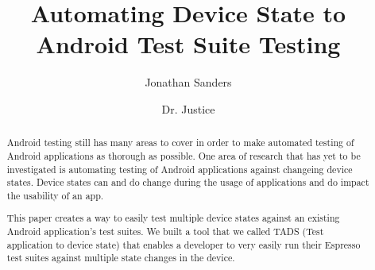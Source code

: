 \documentclass[sigconf]{acmart}
\begin{document}
\title{Automating Device State to Android Test Suite Testing }

\author{Jonathan Sanders}

\author{Dr. Justice}





\begin{abstract}
Android testing still has many areas to cover in order to make automated testing of Android applications as thorough as possible.  One area of research that has yet to be investigated is automating testing of Android applications against changeing device states.  Device states can and do change during the usage of applications and do impact the usability of an app.

This paper creates a way to easily test multiple device states against an existing Android application's test suites.  We built a tool that we called TADS (Test application to device state) that enables a developer to very easily run their Espresso test suites against multiple state changes in the device.  
\end{abstract}





\maketitle




 
\end{document}

